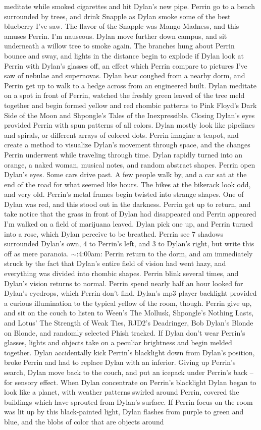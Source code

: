 \documentclass[12pt]{book}
\begin{document}
meditate while smoked cigarettes and hit Dylan's new pipe. Perrin go to a bench surrounded by trees, and drink Snapple as Dylan smoke some of the best blueberry I've saw. The flavor of the Snapple was Mango Madness, and this amuses Perrin. I'm nauseous. Dylan move further down campus, and sit underneath a willow tree to smoke again. The branches hung about Perrin bounce and sway, and lights in the distance begin to explode if Dylan look at Perrin with Dylan's glasses off, an effect which Perrin compare to pictures I've saw of nebulae and supernovas. Dylan hear coughed from a nearby dorm, and Perrin get up to walk to a hedge across from an engineered built. Dylan meditate on a spot in front of Perrin, watched the freshly green leaved of the tree meld together and begin formed yellow and red rhombic patterns to Pink Floyd's Dark Side of the Moon and Shpongle's Tales of the Inexpressible. Closing Dylan's eyes provided Perrin with spun patterns of all colors. Dylan mostly look like pipelines and spirals, or different arrays of colored dots. Perrin imagine a teapot, and create a method to visualize Dylan's movement through space, and the changes Perrin underwent while traveling through time. Dylan rapidly turned into an orange, a naked woman, musical notes, and random abstract shapes. Perrin open Dylan's eyes. Some cars drive past. A few people walk by, and a car sat at the end of the road for what seemed like hours. The bikes at the bikerack look odd, and very old. Perrin's metal frames begin twisted into strange shapes. One of Dylan was red, and this stood out in the darkness. Perrin get up to return, and take notice that the grass in front of Dylan had disappeared and Perrin appeared I'm walked on a field of marijuana leaved. Dylan pick one up, and Perrin turned into a rose, which Dylan perceive to be breathed. Perrin see 7 shadows surrounded Dylan's own, 4 to Perrin's left, and 3 to Dylan's right, but write this off as mere paranoia. $\sim$:4:00am: Perrin return to the dorm, and am immediately struck by the fact that Dylan's entire field of vision had went hazy, and everything was divided into rhombic shapes. Perrin blink several times, and Dylan's vision returns to normal. Perrin spend nearly half an hour looked for Dylan's eyedrops, which Perrin don't find. Dylan's mp3 player backlight provided a curious illumination to the typical yellow of the room, though. Perrin give up, and sit on the couch to listen to Ween's The Mollusk, Shpongle's Nothing Lasts, and Lotus' The Strength of Weak Ties, RJD2's Deadringer, Bob Dylan's Blonde on Blonde, and randomly selected Phish tracked. If Dylan don't wear Perrin's glasses, lights and objects take on a peculiar brightness and begin melded together. Dylan accidentally kick Perrin's blacklight down from Dylan's position, broke Perrin and had to replace Dylan with an inferior. Giving up Perrin's search, Dylan move back to the couch, and put an icepack under Perrin's back -- for sensory effect. When Dylan concentrate on Perrin's blacklight Dylan began to look like a planet, with weather patterns swirled around Perrin, covered the buildings which have sprouted from Dylan's surface. If Perrin focus on the room was lit up by this black-painted light, Dylan flashes from purple to green and blue, and the blobs of color that are objects around 
\end{document}
